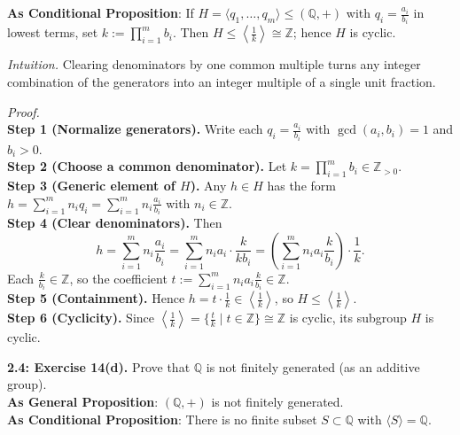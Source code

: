 \documentclass[12pt]{article}
\theoremstyle{definition}
\begin{document}
\noindent \textbf{As Conditional Proposition}: If $H=\langle q_1,\dots,q_m\rangle\le(\mathbb Q,+)$ with $q_i=\frac{a_i}{b_i}$ in lowest terms, set $k:=\prod_{i=1}^m b_i$. Then $H\le\left\langle\frac{1}{k}\right\rangle\cong\mathbb Z$; hence $H$ is cyclic.

\newpage

\dotfill

\emph{Intuition.} Clearing denominators by one common multiple turns any integer combination of the generators into an integer multiple of a single unit fraction.\\

\dotfill

\emph{Proof.}\\
\textbf{Step 1 (Normalize generators).} Write each $q_i=\frac{a_i}{b_i}$ with $\gcd(a_i,b_i)=1$ and $b_i>0$.\\
\textbf{Step 2 (Choose a common denominator).} Let $k=\prod_{i=1}^m b_i\in\mathbb Z_{>0}$.\\
\textbf{Step 3 (Generic element of $H$).} Any $h\in H$ has the form $h=\sum_{i=1}^m n_i q_i=\sum_{i=1}^m n_i\frac{a_i}{b_i}$ with $n_i\in\mathbb Z$.\\
\textbf{Step 4 (Clear denominators).} Then
\[
h=\sum_{i=1}^m n_i\frac{a_i}{b_i}
=\sum_{i=1}^m n_i a_i\cdot\frac{k}{k b_i}
=\left(\sum_{i=1}^m n_i a_i \frac{k}{b_i}\right)\cdot\frac{1}{k}.
\]
Each $\frac{k}{b_i}\in\mathbb Z$, so the coefficient $t:=\sum_{i=1}^m n_i a_i \frac{k}{b_i}\in\mathbb Z$.\\
\textbf{Step 5 (Containment).} Hence $h=t\cdot \frac{1}{k}\in \left\langle\frac{1}{k}\right\rangle$, so $H\le\left\langle\frac{1}{k}\right\rangle$.\\
\textbf{Step 6 (Cyclicity).} Since $\left\langle\frac{1}{k}\right\rangle=\{\frac{t}{k}\mid t\in\mathbb Z\}\cong\mathbb Z$ is cyclic, its subgroup $H$ is cyclic.\\

\newpage



\noindent \textbf{2.4: Exercise 14(d).} Prove that $\mathbb Q$ is not finitely generated (as an additive group).\\ %

\noindent\textbf{As General Proposition}: $(\mathbb Q,+)$ is not finitely generated.\\

\noindent \textbf{As Conditional Proposition}: There is no finite subset $S\subset\mathbb Q$ with $\langle S\rangle=\mathbb Q$.
\end{document}
